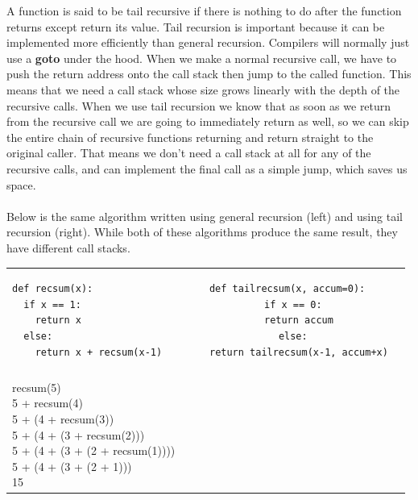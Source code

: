 \documentclass[9pt]{extarticle} %
\begin{document}
%
%
\begin{minipage}[t]{.66\linewidth} %
\vspace{-0.4cm}
\hypertarget{firstnews}{}
	A function is said to be tail recursive if there is nothing to do after the function returns except return its value. Tail recursion is important because it can be implemented more efficiently than general recursion. Compilers will normally just use a \textbf{goto} under the hood. When we make a normal recursive call, we have to push the return address onto the call stack then jump to the called function. This means that we need a call stack whose size grows linearly with the depth of the recursive calls. When we use tail recursion we know that as soon as we return from the recursive call we are going to immediately return as well, so we can skip the entire chain of recursive functions returning and return straight to the original caller. That means we don't need a call stack at all for any of the	recursive calls, and can implement the final call as a simple jump, which saves us space. \\
\\
Below is the same algorithm written using general recursion (left) and using tail recursion (right). While both of these algorithms produce the same result, they have different call stacks. \\

\begin{tabular}{ l c r }
\begin{lstlisting}
def recsum(x):
  if x == 1:
    return x
  else:
    return x + recsum(x-1)
\end{lstlisting}
&
\begin{lstlisting}
def tailrecsum(x, accum=0):
  if x == 0:
    return accum
  else:
    return tailrecsum(x-1, accum+x)
\end{lstlisting}
\\
\\
\makecell{
recsum(5) \\
5 + recsum(4) \\
5 + (4 + recsum(3)) \\
5 + (4 + (3 + recsum(2))) \\
5 + (4 + (3 + (2 + recsum(1)))) \\
5 + (4 + (3 + (2 + 1))) \\
15 \\}


\end{tabular}
\end{minipage}
\end{document}
